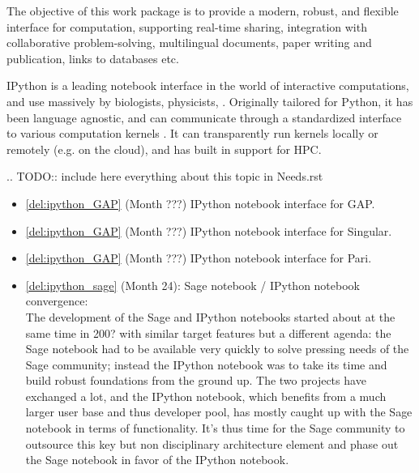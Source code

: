 \addtocounter{wpno}{1}
\begin{Workpackage}{\thewpno}
\WPTitle{\wpname{\thewpno}}

\begin{WPObjectives}
  The objective of this work package is to provide a modern, robust,
  and flexible interface for computation, supporting real-time
  sharing, integration with collaborative problem-solving,
  multilingual documents, paper writing and publication, links to
  databases etc.
\end{WPObjectives}

\begin{WPDescription}


  IPython is a leading notebook interface in the world of interactive
  computations, and use massively by biologists, physicists, . Originally tailored for Python, it has been
  language agnostic, and can communicate through a standardized
  interface to various computation kernels . It can
  transparently run kernels locally or remotely (e.g. on the cloud),
  and has built in support for HPC.


  .. TODO:: include here everything about this topic in Needs.rst
\end{WPDescription}


\begin{WPDeliverables}
  \begin{itemize}
  \item \ref{del:ipython_GAP} (Month ???) IPython notebook interface for GAP.
  \item \ref{del:ipython_GAP} (Month ???) IPython notebook interface for Singular.
  \item \ref{del:ipython_GAP} (Month ???) IPython notebook interface for Pari.
  \item \ref{del:ipython_sage} (Month 24): Sage
    notebook / IPython notebook convergence:\\
    The development of the Sage and IPython notebooks started about at
    the same time in 200? with similar target features but a different
    agenda: the Sage notebook had to be available very quickly to
    solve pressing needs of the Sage community; instead the IPython
    notebook was to take its time and build robust foundations from
    the ground up. The two projects have exchanged a lot, and the
    IPython notebook, which benefits from a much larger user base and
    thus developer pool, has mostly caught up with the Sage notebook
    in terms of functionality. It's thus time for the Sage community
    to outsource this key but non disciplinary architecture element
    and phase out the Sage notebook in favor of the IPython notebook.


\end{itemize}
\end{WPDeliverables}
\end{Workpackage}
